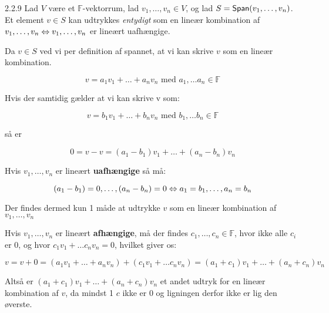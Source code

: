 \begin{saetning}{2.2.9}
	Lad $V$ være et $\mathbb{F}$-vektorrum, lad $v_1, \dots, v_n \in V$, og lad
	$S = \textsf{Span}(v_1, \dots, v_n)$. Et element $v \in S$ kan udtrykkes 
	\textit{entydigt} som en lineær kombination af $v_1, \dots, v_n \Leftrightarrow v_1, 
	\dots, v_n$ er lineært uafhængige.
\end{saetning}

\begin{bevis}
Da $v \in S$ ved vi per definition af spannet, at vi kan skrive $v$ som en 
lineær kombination.

\[
	v = a_1 v_1 + \dots + a_n v_n \text{ med } a_1, \dots a_n \in \mathbb{F}
\]

Hvis der samtidig gælder at vi kan skrive v som:

\[
	v = b_1 v_1 + \dots + b_n v_n \text{ med } b_1, \dots b_n \in \mathbb{F}
\]

så er 

\[
	0 = v - v = (a_1-b_1)v_1 + \dots + (a_n-b_n)v_n
\]

Hvis $v_1, \dots, v_n$ er lineært \textbf{uafhængige} så må:

\[
	(a_1-b_1) = 0, \dots, (a_n-b_n) = 0 \Leftrightarrow a_1 = b_1, \dots, a_n = b_n
\]

Der findes dermed kun 1 måde at udtrykke $v$ som en lineær kombination af 
$v_1, \dots, v_n$

Hvis $v_1, \dots, v_n$ er lineært \textbf{afhængige}, må der findes $c_1, 
\dots, c_n \in \mathbb{F}$, hvor ikke alle $c_i$ er 0, og hvor $c_1 v_1 + \dots
c_n v_n = 0$, hvilket giver os:

\[
	v = v + 0 = (a_1 v_1 + \dots + a_n v_n) + (c_1 v_1 + \dots c_n v_n)
	= (a_1 + c_1)v_1 + \dots + (a_n + c_n)v_n
\]

Altså er $(a_1 + c_1)v_1 + \dots + (a_n + c_n)v_n$ et andet udtryk for en
lineær kombination af $v$, da mindst 1 $c$ ikke er 0 og ligningen derfor ikke
er lig den øverste.
\end{bevis}

